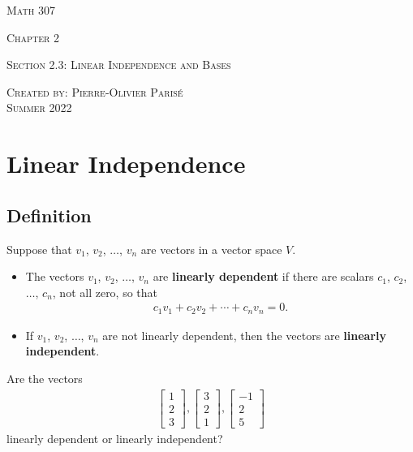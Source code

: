 \documentclass[12pt,a4paper]{article}
\newcounter{example}[section]
\begin{document}
\thispagestyle{empty}

\begin{center}
\vspace*{2.5cm}

{\Huge \textsc{Math 307}}

\vspace*{2cm}

{\LARGE \textsc{Chapter 2}} 

\vspace*{0.75cm}

\noindent\textsc{Section 2.3: Linear Independence and Bases}

\vspace*{0.75cm}

\tableofcontents

\vfill

\noindent \textsc{Created by: Pierre-Olivier Paris{\'e}} \\
\textsc{Summer 2022}
\end{center}

\newpage

\section{Linear Independence}

	\subsection{Definition}
	
	Suppose that $v_1$, $v_2$, $\ldots$, $v_n$ are vectors in a vector space $V$. 
	
	\begin{itemize}
	\item The vectors $v_1$, $v_2$, $\ldots$, $v_n$ are \textbf{linearly dependent} if there are scalars $c_1$, $c_2$, $\ldots$, $c_n$, not all zero, so that
		\begin{align*}
		c_1 v_1 + c_2 v_2 + \cdots + c_n v_n = 0 .
		\end{align*}
	\item If $v_1$, $v_2$, $\ldots$, $v_n$ are not linearly dependent, then the vectors are \textbf{linearly independent}.
	\end{itemize}
	
	\begin{example}
	Are the vectors
		\begin{align*}
		\begin{bmatrix}
		1 \\ 2 \\ 3
		\end{bmatrix},
		\begin{bmatrix}
		3 \\ 2 \\ 1
		\end{bmatrix} , 
		\begin{bmatrix}
		-1 \\ 2 \\ 5
		\end{bmatrix}
		\end{align*}
	linearly dependent or linearly independent?
	\end{example}
	
\end{document}
